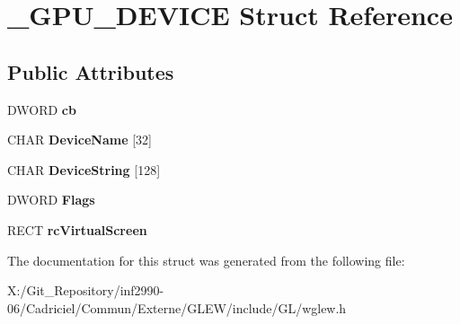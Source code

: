 \hypertarget{struct___g_p_u___d_e_v_i_c_e}{\section{\-\_\-\-G\-P\-U\-\_\-\-D\-E\-V\-I\-C\-E Struct Reference}
\label{struct___g_p_u___d_e_v_i_c_e}
}
\subsection*{Public Attributes}
\begin{DoxyCompactItemize}
\item 
\hypertarget{struct___g_p_u___d_e_v_i_c_e_afcb22f16ba9e526610489ff56ab78ddb}{D\-W\-O\-R\-D {\bfseries cb}}\label{struct___g_p_u___d_e_v_i_c_e_afcb22f16ba9e526610489ff56ab78ddb}

\item 
\hypertarget{struct___g_p_u___d_e_v_i_c_e_a604bfab61f1a2c5d1e635837d369ba14}{C\-H\-A\-R {\bfseries Device\-Name} \mbox{[}32\mbox{]}}\label{struct___g_p_u___d_e_v_i_c_e_a604bfab61f1a2c5d1e635837d369ba14}

\item 
\hypertarget{struct___g_p_u___d_e_v_i_c_e_aff8b7920ccc85afcd6f325da6cdb0b73}{C\-H\-A\-R {\bfseries Device\-String} \mbox{[}128\mbox{]}}\label{struct___g_p_u___d_e_v_i_c_e_aff8b7920ccc85afcd6f325da6cdb0b73}

\item 
\hypertarget{struct___g_p_u___d_e_v_i_c_e_a008db9d0f5fc13a5160805f40465f14a}{D\-W\-O\-R\-D {\bfseries Flags}}\label{struct___g_p_u___d_e_v_i_c_e_a008db9d0f5fc13a5160805f40465f14a}

\item 
\hypertarget{struct___g_p_u___d_e_v_i_c_e_aeb573bbeb3b6c589246720ef259b9a27}{R\-E\-C\-T {\bfseries rc\-Virtual\-Screen}}\label{struct___g_p_u___d_e_v_i_c_e_aeb573bbeb3b6c589246720ef259b9a27}

\end{DoxyCompactItemize}


The documentation for this struct was generated from the following file\-:\begin{DoxyCompactItemize}
\item 
X\-:/\-Git\-\_\-\-Repository/inf2990-\/06/\-Cadriciel/\-Commun/\-Externe/\-G\-L\-E\-W/include/\-G\-L/wglew.\-h\end{DoxyCompactItemize}
